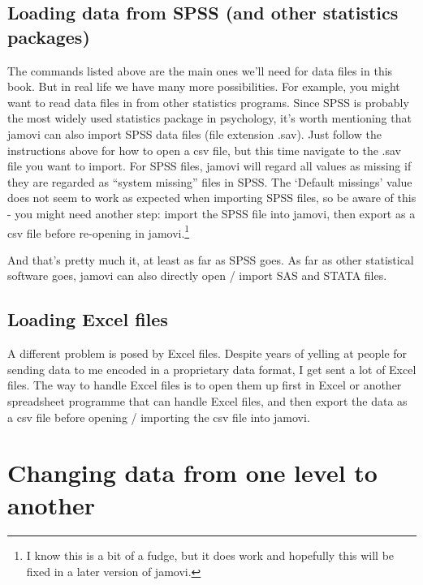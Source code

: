 \documentclass[
]{book}
\begin{document}
\hypertarget{loading-data-from-spss-and-other-statistics-packages}{%
\subsection{Loading data from SPSS (and other statistics packages)}\label{loading-data-from-spss-and-other-statistics-packages}}

The commands listed above are the main ones we'll need for data files in this book. But in real life we have many more possibilities. For example, you might want to read data files in from other statistics programs. Since SPSS is probably the most widely used statistics package in psychology, it's worth mentioning that jamovi can also import SPSS data files (file extension .sav). Just follow the instructions above for how to open a csv file, but this time navigate to the .sav file you want to import. For SPSS files, jamovi will regard all values as missing if they are regarded as ``system missing'' files in SPSS. The `Default missings' value does not seem to work as expected when importing SPSS files, so be aware of this - you might need another step: import the SPSS file into jamovi, then export as a csv file before re-opening in jamovi.\footnote{I know this is a bit of a fudge, but it does work and hopefully this will be fixed in a later version of jamovi.}

And that's pretty much it, at least as far as SPSS goes. As far as other statistical software goes, jamovi can also directly open / import SAS and STATA files.

\hypertarget{loading-excel-files}{%
\subsection{Loading Excel files}\label{loading-excel-files}}

A different problem is posed by Excel files. Despite years of yelling at people for sending data to me encoded in a proprietary data format, I get sent a lot of Excel files. The way to handle Excel files is to open them up first in Excel or another spreadsheet programme that can handle Excel files, and then export the data as a csv file before opening / importing the csv file into jamovi.

\hypertarget{changing-data-from-one-level-to-another}{%
\section{Changing data from one level to another}\label{changing-data-from-one-level-to-another}}
\end{document}
